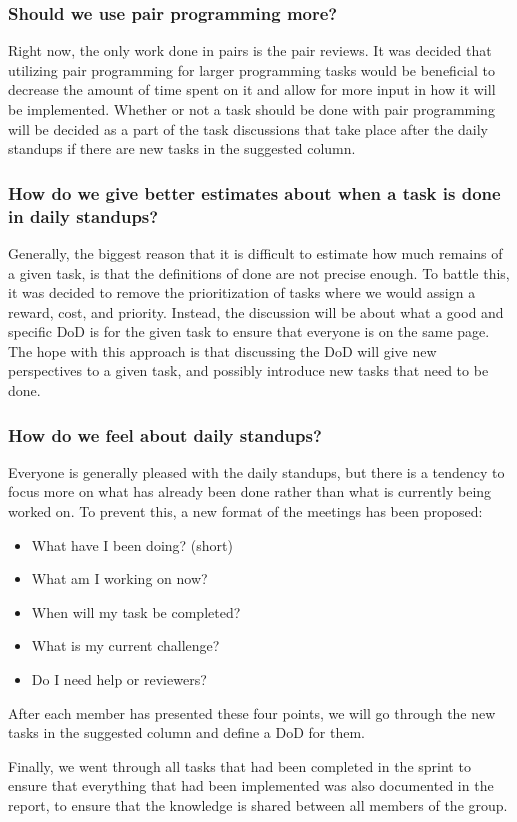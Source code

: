 \subsubsection{Should we use pair programming more?}
Right now, the only work done in pairs is the pair reviews.
It was decided that utilizing pair programming for larger programming tasks would be beneficial to decrease the amount of time spent on it and allow for more input in how it will be implemented.
Whether or not a task should be done with pair programming will be decided as a part of the task discussions that take place after the daily standups if there are new tasks in the suggested column.

\subsubsection{How do we give better estimates about when a task is done in daily standups?}
Generally, the biggest reason that it is difficult to estimate how much remains of a given task, is that the definitions of done are not precise enough.
To battle this, it was decided to remove the prioritization of tasks where we would assign a reward, cost, and priority.
Instead, the discussion will be about what a good and specific DoD is for the given task to ensure that everyone is on the same page.
The hope with this approach is that discussing the DoD will give new perspectives to a given task, and possibly introduce new tasks that need to be done.\\

\subsubsection{How do we feel about daily standups?}
Everyone is generally pleased with the daily standups, but there is a tendency to focus more on what has already been done rather than what is currently being worked on.
To prevent this, a new format of the meetings has been proposed:

\begin{itemize}
	\item{What have I been doing? (short)}
	\item{What am I working on now?}
	\item{When will my task be completed?}
	\item{What is my current challenge?}
	\item{Do I need help or reviewers?}
\end{itemize}

After each member has presented these four points, we will go through the new tasks in the suggested column and define a DoD for them.

Finally, we went through all tasks that had been completed in the sprint to ensure that everything that had been implemented was also documented in the report, to ensure that the knowledge is shared between all members of the group.
